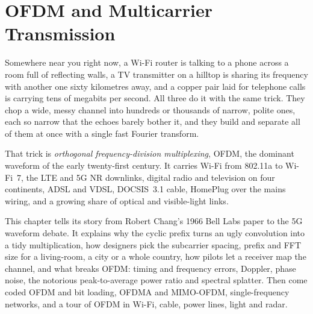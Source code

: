 \chapter{OFDM and Multicarrier Transmission}
\label{ch:ofdm}

\begin{chapterintro}
Somewhere near you right now, a Wi-Fi router is talking to a phone across a room full of
reflecting walls, a TV transmitter on a hilltop is sharing its frequency with another one sixty
kilometres away, and a copper pair laid for telephone calls is carrying tens of megabits per
second. All three do it with the same trick. They chop a wide, messy channel into hundreds or
thousands of narrow, polite ones, each so narrow that the echoes barely bother it, and they build
and separate all of them at once with a single fast Fourier transform.

That trick is \emph{orthogonal frequency-division multiplexing}, OFDM, the dominant waveform of
the early twenty-first century. It carries Wi-Fi from 802.11a to Wi-Fi~7, the LTE and 5G NR
downlinks, digital radio and television on four continents, ADSL and VDSL, DOCSIS~3.1 cable,
HomePlug over the mains wiring, and a growing share of optical and visible-light links.

This chapter tells its story from Robert Chang's 1966 Bell Labs paper to the 5G waveform debate.
It explains why the cyclic prefix turns an ugly convolution into a tidy multiplication, how
designers pick the subcarrier spacing, prefix and FFT size for a living-room, a city or a whole
country, how pilots let a receiver map the channel, and what breaks OFDM: timing and frequency
errors, Doppler, phase noise, the notorious peak-to-average power ratio and spectral splatter.
Then come coded OFDM and bit loading, OFDMA and MIMO-OFDM, single-frequency networks, and a
tour of OFDM in Wi-Fi, cable, power lines, light and radar.
\end{chapterintro}


